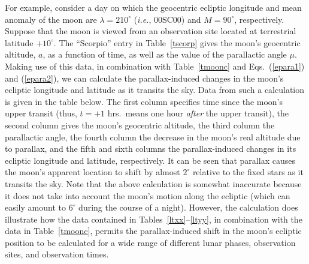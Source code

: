 For example, consider a day on which the geocentric ecliptic longitude  and mean anomaly
of the moon are $\lambda=210^\circ$ ({\em i.e.}, 00SC00) and $M=90^\circ$, respectively. Suppose that the moon is
viewed from an observation site located  at terrestrial latitude $+10^\circ$. 
The ``Scorpio'' entry in Table~\ref{tscorp} gives the moon's geocentric altitude, $a$, as a function of time, as well as the
value of the parallactic angle $\mu$. Making use of this data,
in combination with Table~\ref{tmoonc} and Eqs.~(\ref{epara1}) and (\ref{epara2}), we can calculate the parallax-induced changes in the moon's ecliptic
longitude and latitude as it transits the sky. 
Data from such a calculation is given in the table below. The first column specifies
time since the  moon's upper transit (thus, $t=+1$ hrs.\ means one hour {\em after}\/ the
upper transit), the second column gives the moon's geocentric altitude, the third column the parallactic angle, 
the
fourth column the decrease in the moon's real altitude due to parallax, and the fifth and
sixth columns the parallax-induced changes in its ecliptic longitude and latitude, respectively. 
It can be seen that parallax causes the moon's apparent location
 to shift by almost $2^\circ$ relative to the fixed stars as it transits the sky. Note that the
above calculation is somewhat inaccurate because it does not take into account the moon's motion along the
ecliptic (which can easily amount to $6^\circ$ during the course of a night).
However, the calculation does illustrate how the data contained in
Tables~\ref{ltxx}--\ref{ltyy}, in combination with the data in Table~\ref{tmoonc}, permits the parallax-induced shift in the moon's ecliptic position
to be calculated for a wide range of different lunar phases,
observation sites, and observation times.

